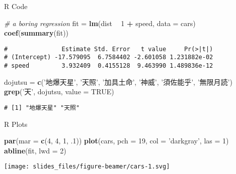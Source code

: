 \documentclass[ignorenonframetext,]{beamer}
\newenvironment{Shaded}{\begin{snugshade}}{\end{snugshade}}
\newcommand{\CommentTok}[1]{\textcolor[rgb]{0.56,0.35,0.01}{\textit{#1}}}
\newcommand{\DataTypeTok}[1]{\textcolor[rgb]{0.13,0.29,0.53}{#1}}
\newcommand{\DecValTok}[1]{\textcolor[rgb]{0.00,0.00,0.81}{#1}}
\newcommand{\FloatTok}[1]{\textcolor[rgb]{0.00,0.00,0.81}{#1}}
\newcommand{\KeywordTok}[1]{\textcolor[rgb]{0.13,0.29,0.53}{\textbf{#1}}}
\newcommand{\NormalTok}[1]{#1}
\newcommand{\OperatorTok}[1]{\textcolor[rgb]{0.81,0.36,0.00}{\textbf{#1}}}
\newcommand{\OtherTok}[1]{\textcolor[rgb]{0.56,0.35,0.01}{#1}}
\newcommand{\StringTok}[1]{\textcolor[rgb]{0.31,0.60,0.02}{#1}}
\begin{document}
\begin{frame}[fragile]{R Code}
\protect\hypertarget{r-code}{}

\begin{Shaded}
\begin{Highlighting}[]
\CommentTok{# a boring regression}
\NormalTok{fit =}\StringTok{ }\KeywordTok{lm}\NormalTok{(dist }\OperatorTok{~}\StringTok{ }\DecValTok{1} \OperatorTok{+}\StringTok{ }\NormalTok{speed, }\DataTypeTok{data =}\NormalTok{ cars)}
\KeywordTok{coef}\NormalTok{(}\KeywordTok{summary}\NormalTok{(fit))}
\end{Highlighting}
\end{Shaded}

\begin{verbatim}
#               Estimate Std. Error   t value     Pr(>|t|)
# (Intercept) -17.579095  6.7584402 -2.601058 1.231882e-02
# speed         3.932409  0.4155128  9.463990 1.489836e-12
\end{verbatim}

\begin{Shaded}
\begin{Highlighting}[]
\NormalTok{dojutsu =}\StringTok{ }\KeywordTok{c}\NormalTok{(}\StringTok{'地爆天星'}\NormalTok{, }\StringTok{'天照'}\NormalTok{, }\StringTok{'加具土命'}\NormalTok{, }\StringTok{'神威'}\NormalTok{, }\StringTok{'須佐能乎'}\NormalTok{, }\StringTok{'無限月読'}\NormalTok{)}
\KeywordTok{grep}\NormalTok{(}\StringTok{'天'}\NormalTok{, dojutsu, }\DataTypeTok{value =} \OtherTok{TRUE}\NormalTok{)}
\end{Highlighting}
\end{Shaded}

\begin{verbatim}
# [1] "地爆天星" "天照"
\end{verbatim}

\end{frame}

\begin{frame}[fragile]{R Plots}
\protect\hypertarget{r-plots}{}

\begin{Shaded}
\begin{Highlighting}[]
\KeywordTok{par}\NormalTok{(}\DataTypeTok{mar =} \KeywordTok{c}\NormalTok{(}\DecValTok{4}\NormalTok{, }\DecValTok{4}\NormalTok{, }\DecValTok{1}\NormalTok{, }\FloatTok{.1}\NormalTok{))}
\KeywordTok{plot}\NormalTok{(cars, }\DataTypeTok{pch =} \DecValTok{19}\NormalTok{, }\DataTypeTok{col =} \StringTok{'darkgray'}\NormalTok{, }\DataTypeTok{las =} \DecValTok{1}\NormalTok{)}
\KeywordTok{abline}\NormalTok{(fit, }\DataTypeTok{lwd =} \DecValTok{2}\NormalTok{)}
\end{Highlighting}
\end{Shaded}

\texttt{[image: slides\_files/figure-beamer/cars-1.svg]}

\end{frame}
\end{document}
